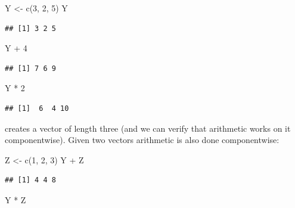\documentclass[
]{book}
\newenvironment{Shaded}{\begin{snugshade}}{\end{snugshade}}
\newcommand{\DecValTok}[1]{\textcolor[rgb]{0.00,0.00,0.81}{#1}}
\newcommand{\FunctionTok}[1]{\textcolor[rgb]{0.00,0.00,0.00}{#1}}
\newcommand{\NormalTok}[1]{#1}
\newcommand{\OtherTok}[1]{\textcolor[rgb]{0.56,0.35,0.01}{#1}}
\newcommand{\SpecialCharTok}[1]{\textcolor[rgb]{0.00,0.00,0.00}{#1}}
\begin{document}
\begin{Shaded}
\begin{Highlighting}[]
\NormalTok{Y }\OtherTok{\textless{}{-}} \FunctionTok{c}\NormalTok{(}\DecValTok{3}\NormalTok{, }\DecValTok{2}\NormalTok{, }\DecValTok{5}\NormalTok{)}
\NormalTok{Y}
\end{Highlighting}
\end{Shaded}

\begin{verbatim}
## [1] 3 2 5
\end{verbatim}

\begin{Shaded}
\begin{Highlighting}[]
\NormalTok{Y }\SpecialCharTok{+} \DecValTok{4}
\end{Highlighting}
\end{Shaded}

\begin{verbatim}
## [1] 7 6 9
\end{verbatim}

\begin{Shaded}
\begin{Highlighting}[]
\NormalTok{Y }\SpecialCharTok{*} \DecValTok{2}
\end{Highlighting}
\end{Shaded}

\begin{verbatim}
## [1]  6  4 10
\end{verbatim}

creates a vector of length three (and we can verify that arithmetic works on it componentwise). Given two vectors arithmetic is also done componentwise:

\begin{Shaded}
\begin{Highlighting}[]
\NormalTok{Z }\OtherTok{\textless{}{-}} \FunctionTok{c}\NormalTok{(}\DecValTok{1}\NormalTok{, }\DecValTok{2}\NormalTok{, }\DecValTok{3}\NormalTok{)}
\NormalTok{Y }\SpecialCharTok{+}\NormalTok{ Z}
\end{Highlighting}
\end{Shaded}

\begin{verbatim}
## [1] 4 4 8
\end{verbatim}

\begin{Shaded}
\begin{Highlighting}[]
\NormalTok{Y }\SpecialCharTok{*}\NormalTok{ Z}
\end{Highlighting}
\end{Shaded}
\end{document}
